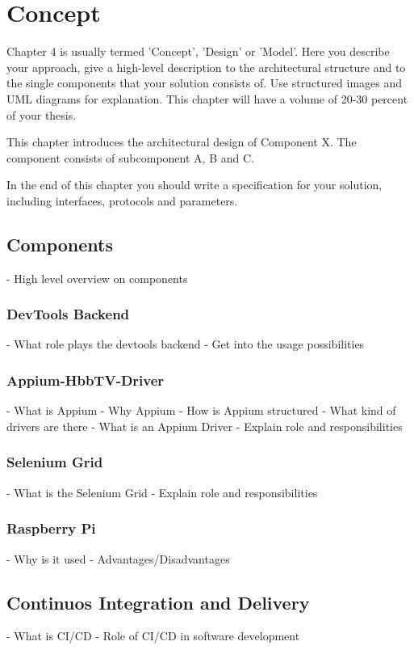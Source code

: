 \chapter{Concept\label{cha:chapter4}}

Chapter 4 is usually termed 'Concept', 'Design' or 'Model'. Here you describe your approach, give a
high-level description to the architectural structure and to the single components that your solution
consists of. Use structured images and UML diagrams for explanation. This chapter will have a volume
of 20-30 percent of your thesis.

This chapter introduces the architectural design of Component X. The component consists of
subcomponent A, B and C.

In the end of this chapter you should write a specification for your solution, including
interfaces, protocols and parameters.

\section{Components\label{sec:components}}

- High level overview on components

\subsection{DevTools Backend\label{sec:devtoolsbackend}}

- What role plays the devtools backend
- Get into the usage possibilities

\subsection{Appium-HbbTV-Driver\label{sec:appiumhbbtvdriver}}

- What is Appium
- Why Appium
- How is Appium structured
- What kind of drivers are there
- What is an Appium Driver
- Explain role and responsibilities

\subsection{Selenium Grid\label{sec:grid}}

- What is the Selenium Grid
- Explain role and responsibilities

\subsection{Raspberry Pi\label{sec:pi}}

- Why is it used
- Advantages/Disadvantages

\section{Continuos Integration and Delivery\label{sec:cicd}}

- What is CI/CD
- Role of CI/CD in software development
